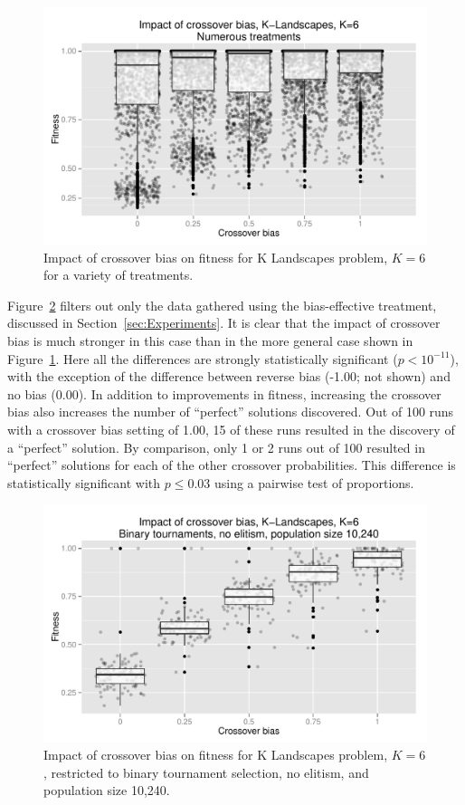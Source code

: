 \documentclass{sig-alternate}
\begin{document}
\begin{figure}
\centering
\includegraphics[width=0.45 \textwidth]{Plots/KLandscapes6_XO_bias_impact_transformed_boxplot_alpha075.pdf}
\caption{Impact of crossover bias on fitness for K Landscapes problem, $K=6$ for a variety of treatments.}
\label{fig:KLandscapes6_results}
\end{figure}

Figure~\ref{fig:KLandscapes6_strong_results} filters out only the data gathered using the bias-effective treatment,
discussed in Section~\ref{sec:Experiments}. It is clear that the impact of crossover bias is much stronger in this case
than in the more general case shown in Figure~\ref{fig:KLandscapes6_results}. Here all the differences are strongly
statistically significant ($p < 10^{-11}$), with the exception of the difference between reverse bias (-1.00; not shown)
and no bias (0.00). In addition to improvements in fitness, increasing the crossover bias also increases the number of
``perfect'' solutions discovered. Out of 100 runs with a crossover bias setting of 1.00, 15 of these runs resulted in
the discovery of a ``perfect'' solution. By comparison, only 1 or 2 runs out of 100 resulted in ``perfect'' solutions
for each of the other crossover probabilities. This difference is statistically significant with $p \leq 0.03$ using a
pairwise test of proportions.

\begin{figure}
\centering
\includegraphics[width=0.45 \textwidth]{Plots/KLandscapes6_XO_bias_strong_impact_alpha_075.pdf}
\caption{Impact of crossover bias on fitness for K Landscapes problem, $K=6$, restricted to binary tournament
selection, no elitism, and population size 10,240.}
\label{fig:KLandscapes6_strong_results}
\end{figure}
\end{document}
